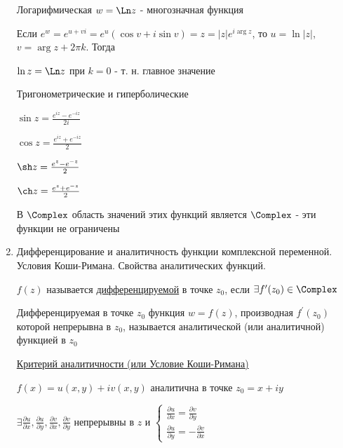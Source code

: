 \documentclass[12pt]{article}
\begin{document}
\begin{enumerate}
     Логарифмическая $w = \Ln z$ - многозначная функция
    
    Если $e^w = e^{u + vi} = e^u (\cos v + i \sin v) = z = |z| e^{i\arg z}$, то $u = \ln |z|$, $v = \arg z + 2\pi k$. Тогда 
    
    $\ln z = \Ln z$ при $k = 0$ - т. н. главное значение
    
     Тригонометрические и гиперболические

    \begin{multicols}{2}
        \begin{center}
            $\sin z = \frac{e^{iz} - e^{-iz}}{2i}$

            $\cos z = \frac{e^{iz} + e^{-iz}}{2}$

            $\sh z = \frac{e^{z} - e^{-z}}{2}$

            $\ch z = \frac{e^{z} + e^{-z}}{2}$
        \end{center}
    \end{multicols}

    В $\Complex$ область значений этих функций является $\Complex$ - эти функции не ограничены


    \item Дифференцирование и аналитичность функции комплексной переменной. Условия Коши-Римана. Свойства аналитических функций.

    \Def $f(z)$ называется \hyperlink{derivative}{дифференцируемой} в точке $z_0$, если $\exists f^\prime(z_0) \in \Complex$

    \Defs Дифференцируемая в точке $z_0$ функция $w = f(z)$, производная $f^\prime(z_0)$ которой непрерывна в $z_0$, называется аналитической (или аналитичной) функцией в $z_0$

    \begin{MyTheorem}
        \Ths \hyperlink{cauchy_riemann}{Критерий аналитичности (или Условие Коши-Римана)}
    
        \begin{center}
            $f(x) = u(x, y) + i v(x, y)$ аналитична в точке $z_0 = x + iy$ 
            
        
            $\exists \frac{\partial u}{\partial x}, \frac{\partial u}{\partial y}, \frac{\partial v}{\partial x}, \frac{\partial v}{\partial y}$ непрерывны в $z$ и
            $\begin{cases}\frac{\partial u}{\partial x} = \frac{\partial v}{\partial y} \\ \frac{\partial u}{\partial y} = -\frac{\partial v}{\partial x}\end{cases}$
        \end{center}
    

\end{MyTheorem}
\end{enumerate}
\end{document}
